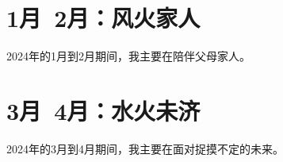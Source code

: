 \documentclass{si_template/cn_note}
\begin{document}
\frontmatter
\mainmatter

\chapter{1月~2月：风火家人}

2024年的1月到2月期间，我主要在陪伴父母家人。

\chapter{3月~4月：水火未济}

2024年的3月到4月期间，我主要在面对捉摸不定的未来。

\backmatter
\end{document}

